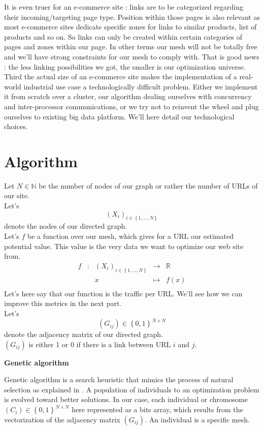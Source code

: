 \documentclass{iSWAGArticle}
\begin{document}
It is even truer for an e-commerce site : links are to be categorized regarding their incoming/targeting page type. Position within those pages
is also relevant as most e-commerce sites dedicate specific zones for links to similar products, list of products and so on.
So links can only be created within certain categories of pages and zones within our page. In other terms our mesh will not be totally free and 
we'll have strong constraints for our mesh to comply with. That is good news : the less linking possibilities we got, the smaller is our optimization universe.
\\
\indent
Third the actual size of an e-commerce site makes the implementation of a real-world industrial use case a technologically difficult problem.
Either we implement it from scratch over a cluster, our algorithm dealing ourselves with concurrency and inter-processor communications,
or we try not to reinvent the wheel and plug ourselves to existing big data platform. We'll here detail our technological choices.
\section{Algorithm}
Let $N \in \mathbb{N}$ be the number of nodes of our graph or rather the number of URLs of our site.
 \\\newline
Let's $$\left(X_i\right)_{i \in \left\{1,...,N\right\}}$$ denote the nodes of our directed graph.
 \\\newline
Let's $f$ be a function over our mesh, which gives for a URL our estimated potential value. This value is the
very data we want to optimize our web site from.
\begin{equation}
\begin{array}{ccccc}
f & : & \left(X_i\right)_{i \in \left\{1,...,N\right\}} & \to & \mathbb{R} \\
 & & x & \mapsto & f(x) \\
\end{array}
\end{equation}
Let's here say that our function is the traffic per URL. We'll see how we can improve this metrics in the next part.
 \\\newline
Let's $$\left(G_{ij}\right)  \in \left\{0,1\right\}^{N\times N}$$ denote the adjacency matrix of our directed graph.
 \\\newline
$\left(G_{ij}\right)$ is either 1 or 0 if there is a link between URL $i$ and $j$.
\begin{center}
\textbf{\large Genetic algorithm}
\end{center}
Genetic algorithm is a search heuristic that mimics the process of natural selection as explained in \cite{gen_algo}. 
A population of individuals to an optimization problem is evolved toward better solutions. 
In our case, each individual or chromosome $\left(C_{i}\right)  \in \left\{0,1\right\}^{N\times N}$ here represented as a bits array, which results from the vectorization of
the adjacency matrix $\left(G_{ij}\right)$. An individual is a specific mesh. 
\end{document}
